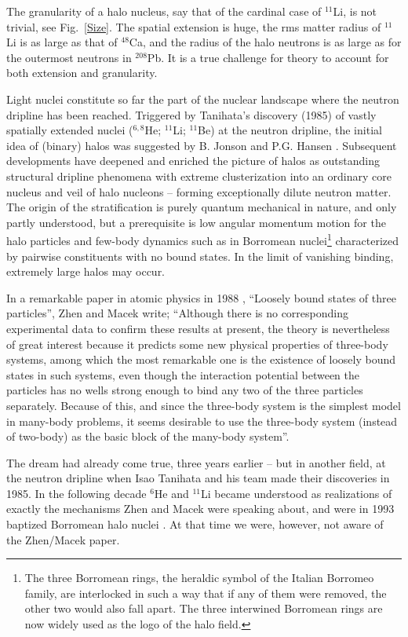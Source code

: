 The granularity of a halo nucleus, say that of the cardinal case
of $^{11}$Li, is not trivial, see Fig.~\ref{Size}. The spatial
extension is huge, the rms matter radius of $^{11}$Li is as large
as that of $^{48}$Ca, and the radius of the halo neutrons is as large
as for the outermost neutrons in $^{208}$Pb. It is a true
challenge for theory to account for both extension and
granularity.

Light nuclei constitute so far the part of the nuclear landscape
where the neutron dripline has been reached.  Triggered by
Tanihata's discovery (1985) \cite{isao} of vastly spatially
extended nuclei ($^{6,8}$He; $^{11}$Li; $^{11}$Be) at the neutron
dripline, the initial idea of (binary) halos was suggested by B.
Jonson and P.G. Hansen \cite{Hansen}. Subsequent developments have
deepened and enriched the picture of halos as outstanding
structural dripline phenomena with extreme clusterization into an
ordinary core nucleus and veil of halo nucleons -- forming
exceptionally dilute neutron matter. The origin of the
stratification is purely quantum mechanical in nature, and only partly
understood, but a prerequisite is low angular momentum motion for
the halo particles and few-body dynamics such as in Borromean
nuclei\footnote{ The three Borromean rings, the heraldic symbol of
the Italian Borromeo family, are interlocked in such a way that if
any of them were removed, the other two would also fall apart. The
three interwined Borromean rings are now widely used as the logo
of the halo field.} characterized by pairwise constituents with no
bound states. In the limit of vanishing binding, extremely large
halos may occur.

In a remarkable paper in atomic physics in 1988 \cite{macek},
``Loosely bound states of three particles'', Zhen and Macek write;
``Although  there is no corresponding experimental data to confirm
these results at present, the theory is nevertheless of great
interest because it predicts some new physical properties of
three-body systems, among which the most remarkable one is the
existence of loosely bound states in such systems, even though the
interaction potential between the particles has no wells strong
enough to bind any two of the three particles separately. Because
of this, and since the three-body system is the simplest  model in
many-body problems, it seems desirable to use the three-body
system (instead of two-body) as the basic block of the many-body
system''.

The dream had already come true, three years earlier  --  but in
another field, at the neutron dripline when Isao Tanihata and his
team made their discoveries in 1985. In the following decade
$^6$He and $^{11}$Li became understood as realizations of exactly
the mechanisms Zhen and Macek were speaking about, and were in 1993
baptized Borromean halo nuclei \cite{zhuk}. At that time we were,
however, not aware of the Zhen/Macek paper.


